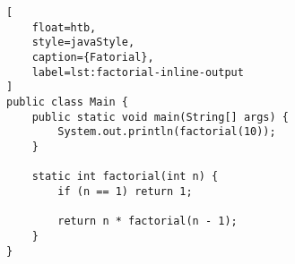 \begin{lstlisting}[
    float=htb, 
    style=javaStyle, 
    caption={Fatorial},
    label=lst:factorial-inline-output
]
public class Main {
    public static void main(String[] args) {
        System.out.println(factorial(10));
    }
    
    static int factorial(int n) {
        if (n == 1) return 1;
        
        return n * factorial(n - 1);
    }
}
\end{lstlisting}

